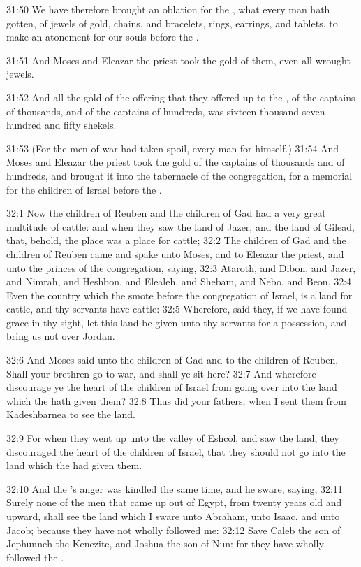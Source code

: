 31:50 We have therefore brought an oblation for the \LORD, what every man hath gotten, of jewels of gold, chains, and bracelets, rings, earrings, and tablets, to make an atonement for our souls before the \LORD.

31:51 And Moses and Eleazar the priest took the gold of them, even all wrought jewels.

31:52 And all the gold of the offering that they offered up to the \LORD, of the captains of thousands, and of the captains of hundreds, was sixteen thousand seven hundred and fifty shekels.

31:53 (For the men of war had taken spoil, every man for himself.)  31:54 And Moses and Eleazar the priest took the gold of the captains of thousands and of hundreds, and brought it into the tabernacle of the congregation, for a memorial for the children of Israel before the \LORD.

32:1 Now the children of Reuben and the children of Gad had a very great multitude of cattle: and when they saw the land of Jazer, and the land of Gilead, that, behold, the place was a place for cattle; 32:2 The children of Gad and the children of Reuben came and spake unto Moses, and to Eleazar the priest, and unto the princes of the congregation, saying, 32:3 Ataroth, and Dibon, and Jazer, and Nimrah, and Heshbon, and Elealeh, and Shebam, and Nebo, and Beon, 32:4 Even the country which the \LORD smote before the congregation of Israel, is a land for cattle, and thy servants have cattle: 32:5 Wherefore, said they, if we have found grace in thy sight, let this land be given unto thy servants for a possession, and bring us not over Jordan.

32:6 And Moses said unto the children of Gad and to the children of Reuben, Shall your brethren go to war, and shall ye sit here?  32:7 And wherefore discourage ye the heart of the children of Israel from going over into the land which the \LORD hath given them?  32:8 Thus did your fathers, when I sent them from Kadeshbarnea to see the land.

32:9 For when they went up unto the valley of Eshcol, and saw the land, they discouraged the heart of the children of Israel, that they should not go into the land which the \LORD had given them.

32:10 And the \LORD's anger was kindled the same time, and he sware, saying, 32:11 Surely none of the men that came up out of Egypt, from twenty years old and upward, shall see the land which I sware unto Abraham, unto Isaac, and unto Jacob; because they have not wholly followed me: 32:12 Save Caleb the son of Jephunneh the Kenezite, and Joshua the son of Nun: for they have wholly followed the \LORD.

